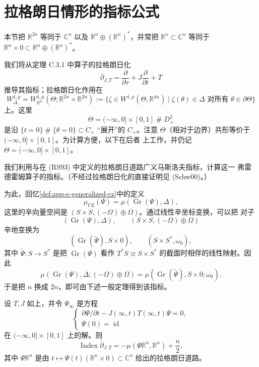 \section{拉格朗日情形的指标公式}
\label{sec:app-c-lagrangian-index-formula}

本节把 $\mathbb R^{2n}$ 等同于 $\mathbb C^n$ 以及
$\mathbb R^n\oplus(\mathbb R^n)^*$，并常把
$\mathbb R^n\subset\mathbb C^n$ 等同于
$\mathbb R^n\times0\subset\mathbb R^n\oplus(\mathbb R^n)^*$。

我们将从定理 C.3.1 中算子的拉格朗日化
\[
 \bar\partial_{J,T}=\frac\partial{\partial\tau}
 +J\frac\partial{\partial t}+T
\]
推导其指标；拉格朗日化作用在
\[
 W_\Delta^{1,p}=W_{\mathbb R^n}^{1,p}
 (\Theta;\mathbb R^{2n}\times\mathbb R^{2n})
 :=\{\zeta\in W^{1,p}(\Theta,\mathbb R^{4n})
       \mid \zeta(\theta)\in\Delta\text{ 对所有 }\theta\in\partial\Theta\}
\]
上。这里
\[
 \Theta=(-\infty,0]\times[0,1]\mathbin{\#}D_+^2
\]
是沿 $\{t=0\}\mathbin{\#}\{\theta=0\}\subset C_+$ “展开”的 $C_+$。注意
$\Theta$（相对于边界）共形等价于 $(-\infty,0]\times[0,1]$。为计算方便，以下在后者
上工作，并仍记 $\Theta=(-\infty,0]\times[0,1]$。

我们利用\personRobbin{}与\personSalamon{}在 (RS93) 中定义的拉格朗日道路广义马斯洛夫指标，计算这一
弗雷德霍姆算子的指标。（不经过拉格朗日化的直接证明见 (Schw00)。）

为此，回忆\cref{def:app-c-generalized-cz}中的定义
\[
 \mu_{\mathrm{CZ}}(\Psi)=\mu(\operatorname{Gr}(\Psi),\Delta),
\]
这里的辛向量空间是 $(S\times S,(-\Omega)\oplus\Omega)$。通过线性辛坐标变换，可以把
对子
\[
 (\operatorname{Gr}(\Psi),\Delta),
 \qquad(S\times S,(-\Omega)\oplus\Omega)
\]
辛地变换为
\[
 (\operatorname{Gr}(\widetilde\Psi),S\times0),
 \qquad(S\times S^*,\omega_0),
\]
其中 $\widetilde\Psi\colon S\to S^*$ 是把
$\operatorname{Gr}(\Psi)$ 看作 $T^*S\cong S\times S^*$ 的截面时相伴的线性映射。因此
\begin{equation}
\label{eq:app-c-graph-coordinate-change}
 \mu(\operatorname{Gr}(\Psi),\Delta;(-\Omega)\oplus\Omega)
 =\mu(\operatorname{Gr}(\widetilde\Psi),S\times0;\omega_0).
\end{equation}
于是把 $n$ 换成 $2n$，即可由下述一般定理得到该指标。

\begin{theorem}
\label{thm:app-c-lagrangian-half-strip-index}
设 $T,J$ 如上，并令 $\Psi_\infty$ 是方程
\begin{equation}
\label{eq:app-c-lagrangian-fundamental-solution}
 \begin{cases}
 \partial\Psi/\partial t-J(\infty,t)T(\infty,t)\Psi=0,\\
 \Psi(0)=\operatorname{id}
 \end{cases}
\end{equation}
在 $(-\infty,0]\times[0,1]$ 上的解。则
\begin{equation}
\label{eq:app-c-negative-half-strip-index}
 \operatorname{Index}\bar\partial_{J,T}
 =-\mu(\Psi\mathbb R^n,\mathbb R^n)+\frac n2,
\end{equation}
其中 $\Psi\mathbb R^n$ 是由
$t\mapsto\Psi(t)(\mathbb R^n\times0)\subset\mathbb C^n$ 给出的拉格朗日道路。
\end{theorem}

